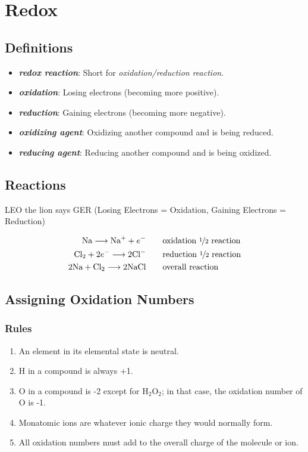 \documentclass[a4paper, 12pt]{article}
\begin{document}
\section{Redox}

\subsection*{Definitions}

\begin{itemize}[leftmargin=*, nosep]
\item \textbf{\textit{redox reaction}}: Short for \textit{oxidation/reduction reaction}.
\item \textbf{\textit{oxidation}}: Losing electrons (becoming more positive). 
\item \textbf{\textit{reduction}}: Gaining electrons (becoming more negative).
\item \textbf{\textit{oxidizing agent}}: Oxidizing another compound and is being reduced.
\item \textbf{\textit{reducing agent}}: Reducing another compound and is being oxidized.
\end{itemize}

\subsection*{Reactions}
LEO the lion says GER (Losing Electrons = Oxidation, Gaining Electrons = Reduction)

\begin{align*}
\text{Na} \longrightarrow \text{Na}^+ + e^- \hspace{2em} & \text{oxidation \nicefrac12 reaction} \\
\text{Cl}_2 + 2e^- \longrightarrow 2\text{Cl}^- \hspace{2em} & \text{reduction \nicefrac12 reaction} \\
2\text{Na} + \text{Cl}_2 \longrightarrow 2\text{NaCl} \hspace{2em} & \text{overall reaction}
\end{align*}

\subsection*{Assigning Oxidation Numbers}

\subsubsection*{Rules}
\begin{enumerate}
\item An element in its elemental state is neutral.
\item H in a compound is always +1.
\item O in a compound is -2 except for H$_2$O$_2$; in that case, the oxidation number of O is -1.
\item Monatomic ions are whatever ionic charge they would normally form.
\item All oxidation numbers must add to the overall charge of the molecule or ion.
\end{enumerate}
\end{document}
